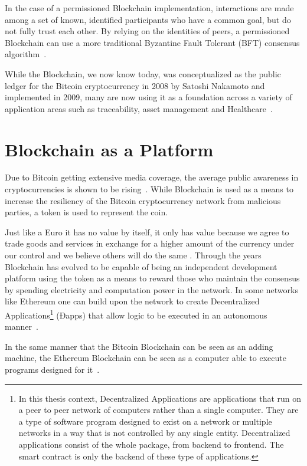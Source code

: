 In the case of a permissioned Blockchain implementation, interactions are made
among a set of known, identified participants who have a common goal, but do
not fully trust each other. By relying on the identities of peers, a
permissioned Blockchain can use a more traditional Byzantine Fault Tolerant
(BFT) consensus algorithm~\cite{Sousa2018}.

While the Blockchain, we now know today, was conceptualized as the public
ledger for the Bitcoin cryptocurrency in 2008 by Satoshi Nakamoto and
implemented in 2009, many are now using it as a foundation across a variety of
application areas such as traceability, asset management and
Healthcare~\cite{MIT2016}.

\section{Blockchain as a Platform} \label{blockchainasaPlatform}

Due to Bitcoin getting extensive media coverage, the average public awareness
in cryptocurrencies is shown to be rising~\cite{BitAwareness2017}. While
Blockchain is used as a means to increase the resiliency of the Bitcoin
cryptocurrency network from malicious parties, a token is used to represent the
coin. 

Just like a Euro it has no value by itself, it only has value because we agree
to trade goods and services in exchange for a higher amount of the currency
under our control and we believe others will do the same \cite{aliessi2016}.
Through the years Blockchain has evolved to be capable of being an independent
development platform using the token as a means to reward those who maintain
the consensus by spending electricity and computation power in the network. In
some networks like Ethereum one can build upon the network to create
Decentralized Applications\footnote{In this thesis context, Decentralized
Applications are applications that run on a peer to peer network of computers
rather than a single computer. They are a type of software program designed to
exist on a network or multiple networks in a way that is not controlled by any
single entity. Decentralized applications consist of the whole package, from
backend to frontend. The smart contract is only the backend of these type of
applications.} (Ðapps) that allow logic to be executed in an autonomous
manner~\cite{Wood2017}. 

In the same manner that the Bitcoin Blockchain can be seen as an adding
machine, the Ethereum Blockchain can be seen as a computer able to execute
programs designed for it~\cite{Wood2015}.

